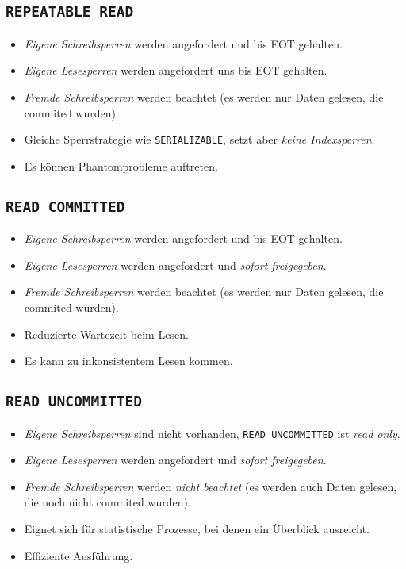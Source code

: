         \subsection{\lstinline|REPEATABLE READ|} %
            \begin{itemize}
            	\item \textit{Eigene Schreibsperren} werden angefordert und bis EOT gehalten.
            	\item \textit{Eigene Lesesperren} werden angefordert uns bis EOT gehalten.
            	\item \textit{Fremde Schreibsperren} werden beachtet (es werden nur Daten gelesen, die commited wurden).
            	\item Gleiche Sperrstrategie wie \lstinline|SERIALIZABLE|, setzt aber \textit{keine Indexsperren}.
            	\item Es können Phantomprobleme auftreten.
            \end{itemize}

        \subsection{\lstinline|READ COMMITTED|} %
            \begin{itemize}
            	\item \textit{Eigene Schreibsperren} werden angefordert und bis EOT gehalten.
            	\item \textit{Eigene Lesesperren} werden angefordert und \textit{sofort freigegeben}.
            	\item \textit{Fremde Schreibsperren} werden beachtet (es werden nur Daten gelesen, die commited wurden).
            	\item Reduzierte Wartezeit beim Lesen.
            	\item Es kann zu inkonsistentem Lesen kommen.
            \end{itemize}

        \subsection{\lstinline|READ UNCOMMITTED|} %
            \begin{itemize}
            	\item \textit{Eigene Schreibsperren} sind nicht vorhanden, \lstinline|READ UNCOMMITTED| ist \textit{read only}.
            	\item \textit{Eigene Lesesperren} werden angefordert und \textit{sofort freigegeben}.
            	\item \textit{Fremde Schreibsperren} werden \textit{nicht beachtet} (es werden auch Daten gelesen, die noch nicht commited wurden).
            	\item Eignet sich für statistische Prozesse, bei denen ein Überblick ausreicht.
            	\item Effiziente Ausführung.
            \end{itemize}
        
